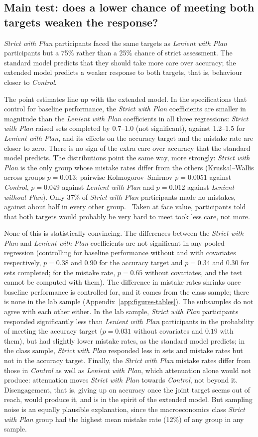\documentclass[12pt, letterpaper]{article}
\newcommand{\CtrlName}{Control}
\newcommand{\LPName}{Lenient with Plan}
\newcommand{\SPName}{Strict with Plan}
\newcommand{\LNName}{Lenient without Plan}
\newcommand{\Ctrl}{\textit{\CtrlName}}
\newcommand{\LP}{\textit{\LPName}}
\newcommand{\SP}{\textit{\SPName}}
\newcommand{\LN}{\textit{\LNName}}
\begin{document}
\subsection{Main test: does a lower chance of meeting both targets weaken the response?}

\SP{} participants faced the same targets as \LP{} participants but a 75\% rather than a 25\% chance of strict assessment. The standard model predicts that they should take more care over accuracy; the extended model predicts a weaker response to both targets, that is, behaviour closer to \Ctrl{}.

The point estimates line up with the extended model. In the specifications that control for baseline performance, the \SP{} coefficients are smaller in magnitude than the \LP{} coefficients in all three regressions: \SP{} raised sets completed by 0.7--1.0 (not significant), against 1.2--1.5 for \LP{}, and its effects on the accuracy target and the mistake rate are closer to zero. There is no sign of the extra care over accuracy that the standard model predicts. The distributions point the same way, more strongly: \SP{} is the only group whose mistake rates differ from the others (Kruskal--Wallis across groups $p = 0.013$; pairwise Kolmogorov--Smirnov $p = 0.0051$ against \Ctrl{}, $p = 0.049$ against \LP{} and $p = 0.012$ against \LN{}). Only 37\% of \SP{} participants made no mistakes, against about half in every other group.%
\ Taken at face value, participants told that both targets would probably be very hard to meet took less care, not more.

None of this is statistically convincing. The differences between the \SP{} and \LP{} coefficients are not significant in any pooled regression (controlling for baseline performance without and with covariates respectively, $p = 0.38$ and $0.90$ for the accuracy target and $p = 0.34$ and $0.30$ for sets completed; for the mistake rate, $p = 0.65$ without covariates, and the test cannot be computed with them). The difference in mistake rates shrinks once baseline performance is controlled for, and it comes from the class sample; there is none in the lab sample (Appendix~\ref{app:figures-tables}). The subsamples do not agree with each other either. In the lab sample, \SP{} participants responded significantly less than \LP{} participants in the probability of meeting the accuracy target ($p = 0.031$ without covariates and $0.19$ with them), but had slightly lower mistake rates, as the standard model predicts; in the class sample, \SP{} responded less in sets and mistake rates but not in the accuracy target. Finally, the \SP{} mistake rates differ from those in \Ctrl{} as well as \LP{}, which attenuation alone would not produce: attenuation moves \SP{} towards \Ctrl{}, not beyond it. Disengagement, that is, giving up on accuracy once the joint target seems out of reach, would produce it, and is in the spirit of the extended model. But sampling noise is an equally plausible explanation, since the macroeconomics class \SP{} group had the highest mean mistake rate (12\%) of any group in any sample.
\end{document}
